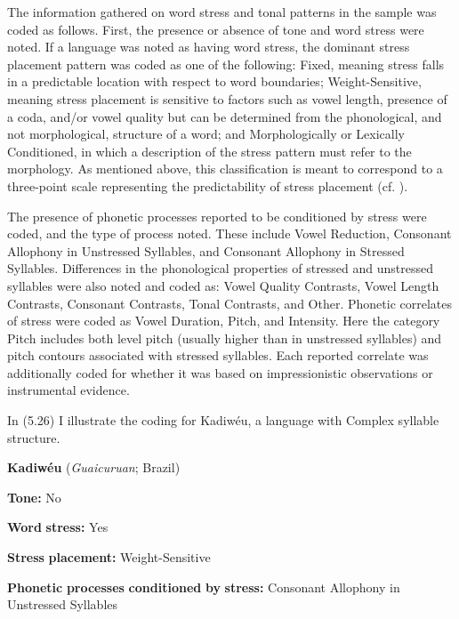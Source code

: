   The information gathered on word stress and tonal patterns in the sample was coded as follows. First, the presence or absence of tone and word stress were noted. If a language was noted as having word stress, the dominant stress placement pattern was coded as one of the following: Fixed, meaning stress falls in a predictable location with respect to word boundaries; Weight-Sensitive, meaning stress placement is sensitive to factors such as vowel length, presence of a coda, and/or vowel quality but can be determined from the phonological, and not morphological, structure of a word; and Morphologically or Lexically Conditioned, in which a description of the stress pattern must refer to the morphology. As mentioned above, this classification is meant to correspond to a three-point scale representing the predictability of stress placement (cf. \citealt{Schiering2007}). 



  The presence of phonetic processes reported to be conditioned by stress were coded, and the type of process noted. These include Vowel Reduction, Consonant Allophony in Unstressed Syllables, and Consonant Allophony in Stressed Syllables. Differences in the phonological properties of stressed and unstressed syllables were also noted and coded as: Vowel Quality Contrasts, Vowel Length Contrasts, Consonant Contrasts, Tonal Contrasts, and Other. Phonetic correlates of stress were coded as Vowel Duration, Pitch, and Intensity. Here the category Pitch includes both level pitch (usually higher than in unstressed syllables) and pitch contours associated with stressed syllables. Each reported correlate was additionally coded for whether it was based on impressionistic observations or instrumental evidence.



  In (5.26) I illustrate the coding for Kadiwéu, a language with Complex syllable structure.



\ea\label{ex:(5.26)}
  \textbf{Kadiwéu} (\textit{Guaicuruan}; Brazil)



\textbf{Tone:} No



\textbf{Word} \textbf{stress:} Yes



\textbf{Stress} \textbf{placement:} Weight-Sensitive



\textbf{Phonetic} \textbf{processes} \textbf{conditioned} \textbf{by} \textbf{stress:} Consonant Allophony in Unstressed Syllables



